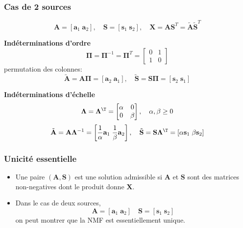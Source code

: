 \documentclass[9pt]{beamer}
\begin{document}
\begin{frame}
\frametitle{Cas de 2 sources}

\begin{equation*}
\mathbf{A} = \left[\mathbf{a}_1 \; \mathbf{a}_2\right], \quad \mathbf{S} = \left[\mathbf{s}_1 \; \mathbf{s}_2\right],\quad  \mathbf{X} = \mathbf{A}\mathbf{S}^T =\tilde{\mathbf{A}}{\tilde{\mathbf{S}}}^T 
\end{equation*}

\alert{\textbf{Indéterminations d'ordre}}
\[
\bm{\Pi} =\bm{\Pi}^{-1} =\bm{\Pi}^{T} = \begin{bmatrix} 0 & 1 \\ 1 & 0
\end{bmatrix}
\]
permutation des colonnes:
\[
\tilde{\mathbf{A}} =\mathbf{A} \bm{\Pi} = \left[\mathbf{a}_2 \; \mathbf{a}_1\right], \quad \tilde{\mathbf{S}} =\mathbf{S} \bm{\Pi} = \left[\mathbf{s}_2 \; \mathbf{s}_1\right]
\]

\alert{\textbf{Indéterminations d'échelle}}
\[
\bm{\Lambda} = \bm{\Lambda}^{\T} = \begin{bmatrix} \alpha & 0 \\ 0 & \beta
\end{bmatrix},\quad \alpha,\beta \ge 0 
\]
\[
\tilde{\mathbf{A}} = \mathbf{A} \bm{\Lambda}^{-1} = \left[\frac{1}{\alpha}\mathbf{a}_1 \; \frac{1}{\beta}\mathbf{a}_2\right],\quad \tilde{\mathbf{S}} = \mathbf{S} \bm{\Lambda}^{\T} =  \left[{\alpha}\mathbf{s}_1 \; {\beta}\mathbf{s}_2\right]
\]




\end{frame}


\begin{frame}
\frametitle{Unicité essentielle}


\begin{itemize}[label=\tiny$\blacksquare$]
\item Une paire $(\mathbf{A},\mathbf{S})$ est une solution admissible si
$\mathbf{A}$ et $\mathbf{S}$ sont des matrices non-negatives dont le produit donne  $\mathbf{X}$.
\\[2ex]


\item Dans le cas de deux sources, \ie
\begin{equation*}
     \mathbf{A} = \left[\mathbf{a}_1 \; \mathbf{a}_2\right] \quad \mathbf{S} = \left[\mathbf{s}_1 \; \mathbf{s}_2\right]
\end{equation*}
on peut montrer que la NMF est essentiellement unique.
\end{itemize}
\end{frame}
\end{document}
